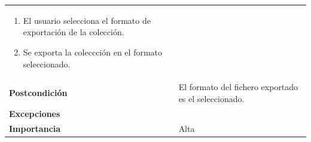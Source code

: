 \documentclass[
]{article}
\providecommand{\tightlist}{%
  \setlength{\itemsep}{0pt}\setlength{\parskip}{0pt}}
\begin{document}
\begin{longtable}[]{@{}ll@{}}
\begin{minipage}[t]{0.68\columnwidth}
\begin{enumerate}
\tightlist
\item
  El usuario selecciona el formato de exportación de la colección.
\item
  Se exporta la coleccción en el formato seleccionado.
\end{enumerate}\strut
\end{minipage}\tabularnewline
\begin{minipage}[t]{0.26\columnwidth}\raggedright
\textbf{Postcondición}\strut
\end{minipage} & \begin{minipage}[t]{0.68\columnwidth}\raggedright
El formato del fichero exportado es el seleccionado.\strut
\end{minipage}\tabularnewline
\begin{minipage}[t]{0.26\columnwidth}\raggedright
\textbf{Excepciones}\strut
\end{minipage} & \begin{minipage}[t]{0.68\columnwidth}\raggedright
\strut
\end{minipage}\tabularnewline
\begin{minipage}[t]{0.26\columnwidth}\raggedright
\textbf{Importancia}\strut
\end{minipage} & \begin{minipage}[t]{0.68\columnwidth}\raggedright
Alta\strut
\end{minipage}\tabularnewline
\bottomrule
\end{longtable}
\end{document}
